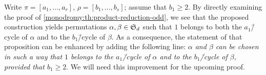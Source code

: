 \begin{remark}\label{monodromy:rm:product-reduction-odd-prescribed-cycles}
Write $\pi=[a_1,\ldots,a_r]$, $\rho=[b_1,\ldots,b_s]$; assume that $b_1\ge 2$. By directly examining the proof of \cref{monodromy:th:product-reduction-odd}, we see that the proposed construction yields permutations $\alpha,\beta\in\symgroup[d]$ such that $1$ belongs to both the $a_1$\=/cycle of $\alpha$ and to the $b_1$\=/cycle of $\beta$. As a consequence, the statement of that proposition can be enhanced by adding the following line: \emph{$\alpha$ and $\beta$ can be chosen in such a way that $1$ belongs to the $a_1$\=/cycle of $\alpha$ and to the $b_1$\=/cycle of $\beta$, provided that $b_1\ge 2$}. We will need this improvement for the upcoming proof.
\end{remark}

